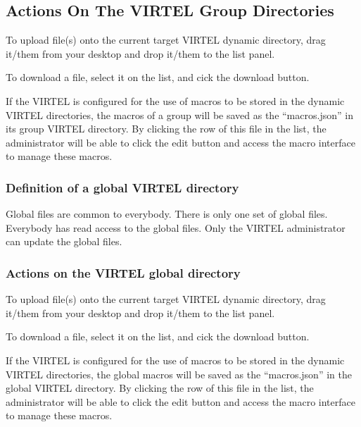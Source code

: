 \documentclass[letterpaper,10pt,english]{sphinxmanual}
\begin{document}
\subsection{Actions On The VIRTEL Group Directories}
\label{\detokenize{User_Guide:actions-on-the-virtel-group-directories}}

To upload file(s) onto the current target VIRTEL dynamic directory, drag it/them from your desktop and drop it/them to the list panel.


To download a file, select it on the list, and cick the download button.


If the VIRTEL is configured for the use of macros to be stored in the dynamic VIRTEL directories, the macros of a group
will be saved as the “macros.json” in its group VIRTEL directory. By clicking the row of this file in the list, the
administrator will be able to click the edit button and access the macro interface to manage these macros.


\subsubsection{Definition of a global VIRTEL directory}
\label{\detokenize{User_Guide:definition-of-a-global-virtel-directory}}
Global files are common to everybody. There is only one set of global files. Everybody has read access to the global files. Only the VIRTEL administrator can update the global files.


\subsubsection{Actions on the VIRTEL global directory}
\label{\detokenize{User_Guide:actions-on-the-virtel-global-directory}}

To upload file(s) onto the current target VIRTEL dynamic directory, drag it/them from your desktop and drop it/them to the list panel.


To download a file, select it on the list, and cick the download button.


If the VIRTEL is configured for the use of macros to be stored in the dynamic VIRTEL directories, the global macros will
be saved as the “macros.json” in the global VIRTEL directory. By clicking the row of this file in the list, the administrator
will be able to click the edit button and access the macro interface to manage these macros.
\end{document}
